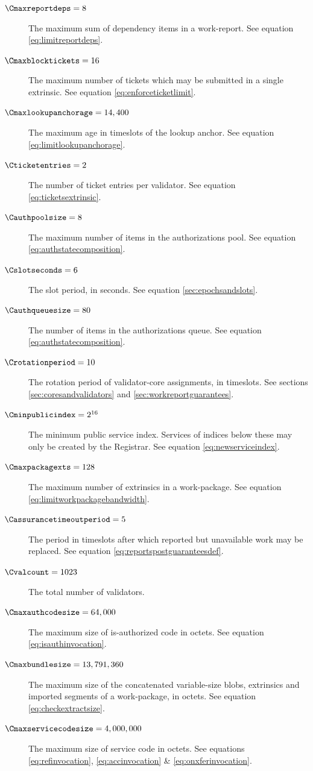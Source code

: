 \begin{description}
  \item[$\Cmaxreportdeps = 8$] The maximum sum of dependency items in a work-report. See equation \ref{eq:limitreportdeps}.
  \item[$\Cmaxblocktickets = 16$] The maximum number of tickets which may be submitted in a single extrinsic. See equation \ref{eq:enforceticketlimit}.
  \item[$\Cmaxlookupanchorage = 14,400$] The maximum age in timeslots of the lookup anchor. See equation \ref{eq:limitlookupanchorage}.
  \item[$\Cticketentries = 2$] The number of ticket entries per validator. See equation \ref{eq:ticketsextrinsic}.
  \item[$\Cauthpoolsize = 8$] The maximum number of items in the authorizations pool. See equation \ref{eq:authstatecomposition}.
  \item[$\Cslotseconds = 6$] The slot period, in seconds. See equation \ref{sec:epochsandslots}.
  \item[$\Cauthqueuesize = 80$] The number of items in the authorizations queue. See equation \ref{eq:authstatecomposition}.
  \item[$\Crotationperiod = 10$] The rotation period of validator-core assignments, in timeslots. See sections \ref{sec:coresandvalidators} and \ref{sec:workreportguarantees}.
  \item[$\Cminpublicindex = 2^{16}$] The minimum public service index. Services of indices below these may only be created by the Registrar. See equation \ref{eq:newserviceindex}.
  \item[$\Cmaxpackagexts = 128$] The maximum number of extrinsics in a work-package. See equation \ref{eq:limitworkpackagebandwidth}.
  \item[$\Cassurancetimeoutperiod = 5$] The period in timeslots after which reported but unavailable work may be replaced. See equation \ref{eq:reportspostguaranteesdef}.
  \item[$\Cvalcount = 1023$] The total number of validators.
  \item[$\Cmaxauthcodesize = 64,000$] The maximum size of is-authorized code in octets. See equation \ref{eq:isauthinvocation}.
  \item[$\Cmaxbundlesize = 13,791,360$] The maximum size of the concatenated variable-size blobs, extrinsics and imported segments of a work-package, in octets. See equation \ref{eq:checkextractsize}.
  \item[$\Cmaxservicecodesize = 4,000,000$] The maximum size of service code in octets. See equations \ref{eq:refinvocation}, \ref{eq:accinvocation} \& \ref{eq:onxferinvocation}.

\end{description}
